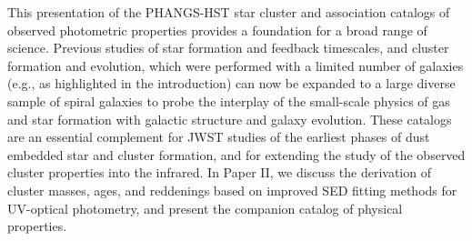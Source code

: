 \documentclass[linenumbers]{aastex63}
\begin{document}
{\begin{enumerate}
\end{enumerate}

This presentation of the PHANGS-HST star cluster and association catalogs of observed photometric properties provides a foundation for a broad range of science. Previous studies of star formation and feedback timescales, and cluster formation and evolution, which were performed with a limited number of galaxies (e.g., as highlighted in the introduction) can now be expanded to a large diverse sample of spiral galaxies to probe the interplay of the small-scale physics of gas and star formation with galactic structure and galaxy evolution.  These catalogs are an essential complement for JWST studies of the earliest phases of dust embedded star and cluster formation, and for extending the study of the observed cluster properties into the infrared.  In Paper II, we discuss the derivation of cluster masses, ages, and reddenings based on improved SED fitting methods for UV-optical photometry, and present the companion catalog of physical properties.  





 

 




}
\end{document}
